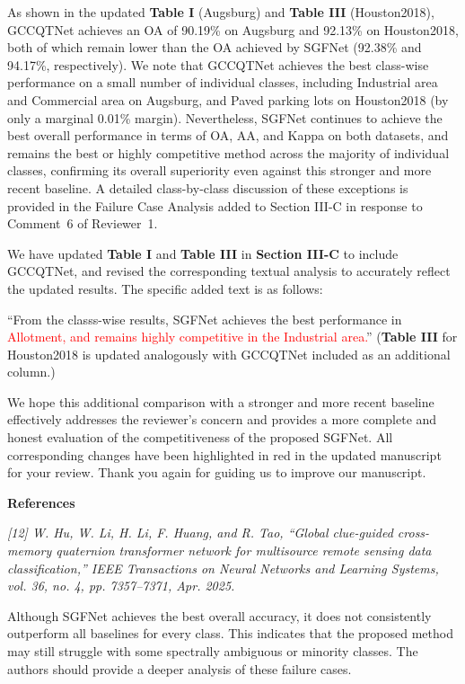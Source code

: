 As shown in the updated \textbf{Table I} (Augsburg) and \textbf{Table III} (Houston2018), GCCQTNet achieves an OA of 90.19\% on Augsburg and 92.13\% on Houston2018, both of which remain lower than the OA achieved by SGFNet (92.38\% and 94.17\%, respectively). We note that GCCQTNet achieves the best class-wise performance on a small number of individual classes, including Industrial area and Commercial area on Augsburg, and Paved parking lots on Houston2018 (by only a marginal 0.01\% margin). Nevertheless, SGFNet continues to achieve the best overall performance in terms of OA, AA, and Kappa on both datasets, and remains the best or highly competitive method across the majority of individual classes, confirming its overall superiority even against this stronger and more recent baseline. A detailed class-by-class discussion of these exceptions is provided in the Failure Case Analysis added to Section III-C in response to Comment~6 of Reviewer~1.

We have updated \textbf{Table I} and \textbf{Table III} in \textbf{Section III-C} to include GCCQTNet, and revised the corresponding textual analysis to accurately reflect the updated results. The specific added text is as follows:

``From the classs-wise results, SGFNet achieves the best performance in \textcolor{red}{Allotment, and remains highly competitive in the Industrial area.}'' (\textbf{Table III} for Houston2018 is updated analogously with GCCQTNet included as an additional column.)

We hope this additional comparison with a stronger and more recent baseline effectively addresses the reviewer's concern and provides a more complete and honest evaluation of the competitiveness of the proposed SGFNet. All corresponding changes have been highlighted in red in the updated manuscript for your review. Thank you again for guiding us to improve our manuscript.

\textbf{References}

{\footnotesize\it
[12] W. Hu, W. Li, H. Li, F. Huang, and R. Tao, ``Global clue-guided cross-memory quaternion transformer network for multisource remote sensing data classification,'' IEEE Transactions on Neural Networks and Learning Systems, vol. 36, no. 4, pp. 7357--7371, Apr. 2025.
}

\vspace{2em}

\begin{tcolorbox}[title={Reviewer \#1, Comment \#6}] 
  \vspace{1em}
  
  \color{blue}
  Although SGFNet achieves the best overall accuracy, it does not consistently outperform all baselines for every class. This indicates that the proposed method may still struggle with some spectrally ambiguous or minority classes. The authors should provide a deeper analysis of these failure cases.

  \vspace{1em}
\end{tcolorbox}


